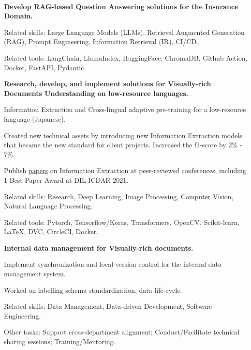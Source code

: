 \\
\vspace{-.2em}
\begin{xitemize}
    \item \textbf{Develop RAG-based Question Answering solutions for the Insurance Domain.}
    \begin{zitemize}
        \item Related skills: Large Language Models (LLMs), Retrieval Augmented
        Generation (RAG), Prompt Engineering, Information Retrieval (IR), CI/CD.
        \item Related tools: LangChain, LlamaIndex, HuggingFace, ChromaDB, Github
        Action, Docker, FastAPI, Pydantic.
    \end{zitemize}
    \item \textbf{Research, develop, and implement solutions for Visually-rich Documents
        Understanding on low-resource languages.}
    \begin{zitemize}
        \item Information Extraction and Cross-lingual adaptive pre-training for a
        low-resource language (Japanese).
        \item Created new technical assets by introducing new Information Extraction models that
        became the new standard for client projects. Increased the f1-score by 2\% - 7\%.
        \item Publish \href{https://scholar.google.com/citations?user=\gscholarid}{papers} on
        Information Extraction at peer-reviewed conferences, including 1 Best Paper Award
        at DIL-ICDAR 2021.
        \item Related skills: Research, Deep Learning, Image Processing, Computer Vision, Natural Language Processing.
        \item Related tools: Pytorch, Tensorflow/Keras, Transformers, OpenCV, Scikit-learn, \LaTeX, DVC, CircleCI, Docker.
    \end{zitemize}
    \item \textbf{Internal data management for Visually-rich documents.}
    \begin{zitemize}
        \item Implement synchronization and local version control for the internal
        data management system.
        \item Worked on labelling schema standardization, data life-cycle.
        \item Related skills: Data Management, Data-driven Development, Software Engineering.
    \end{zitemize}
    \item Other tasks: Support cross-department alignment; Conduct/Facilitate technical sharing sessions; Training/Mentoring.
\end{xitemize}

